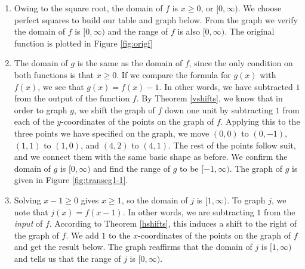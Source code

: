 {
\begin{enumerate}

\item  Owing to the square root, the domain of $f$ is $x \geq 0$, or $[0,\infty)$.  We choose perfect squares to build our table and graph below.  From the graph we verify the domain of $f$ is $[0,\infty)$ and the range of $f$ is also $[0, \infty)$. The original function is plotted in Figure \ref{fig:origf}


\item The domain of $g$ is the same as the domain of $f$, since the only condition on both functions is that $x \geq 0$.  If we compare the formula for $g(x)$ with $f(x)$, we see that $g(x) = f(x) - 1$.  In other words, we have subtracted $1$ from the output of the function $f$. By Theorem \ref{vshifts}, we know that in order to graph $g$, we shift the graph of $f$ down one unit by subtracting $1$ from each of the $y$-coordinates of the points on the graph of $f$.  Applying this to the three points we have specified on the graph, we move $(0,0)$ to $(0,-1)$, $(1,1)$ to $(1,0)$, and $(4,2)$ to $(4,1)$.  The rest of the points follow suit, and we connect them with the same basic shape as before. We confirm the domain of $g$ is $[0, \infty)$ and find the range of $g$ to be $[-1, \infty)$. The graph of $g$ is given in Figure \ref{fig:transeg1-1}.



\item  Solving $x-1 \geq 0$ gives $x \geq 1$, so the domain of $j$ is $[1,\infty)$.  To graph $j$, we note that $j(x) = f(x-1)$.  In other words, we are subtracting $1$ from the \textit{input} of $f$.  According to Theorem \ref{hshifts}, this induces a shift to the right of the graph of $f$.  We add $1$ to the $x$-coordinates of the points on the graph of $f$ and get the result below.  The graph reaffirms that the domain of $j$ is  $[1,\infty)$ and tells us that the range of $j$ is $[0,\infty)$.


\end{enumerate}}
